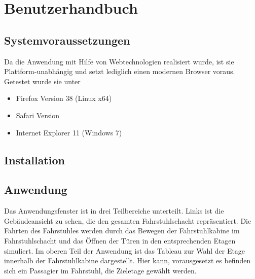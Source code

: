 \part{Benutzerhandbuch}

\chapter{Systemvoraussetzungen}
Da die Anwendung mit Hilfe von Webtechnologien realisiert wurde, ist sie Plattform-unabhängig und setzt lediglich einen modernen Browser  voraus. Getestet wurde sie unter
\begin{itemize}
 \item Firefox Version 38 (Linux x64)
 \item Safari Version 
 \item Internet Explorer 11 (Windows 7) 
\end{itemize}
\chapter{Installation}
\chapter{Anwendung}
Das Anwendungsfenster ist in drei Teilbereiche unterteilt. Links ist die Gebäude\-ansicht zu sehen, die den gesamten Fahrstuhlschacht repräsentiert. Die Fahrten des Fahrstuhles werden durch das Bewegen der Fahrstuhlkabine im Fahrstuhlschacht und das Öffnen der Türen in den entsprechenden Etagen simuliert.
Im oberen Teil der Anwendung ist das Tableau zur Wahl der Etage innerhalb der Fahrstuhlkabine dargestellt. Hier kann, vorausgesetzt es befinden sich ein Passagier im Fahrstuhl, die Zieletage gewählt werden.

